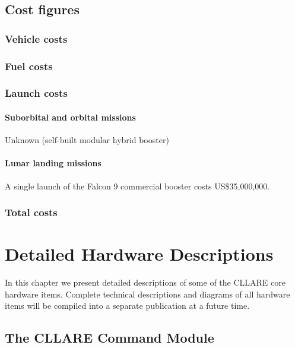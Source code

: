 \documentclass{report}
\begin{document}
\section{Cost figures}

\subsection{Vehicle costs}

\subsection{Fuel costs}

\subsection{Launch costs}

\subsubsection{Suborbital and orbital missions}

Unknown (self-built modular hybrid booster)

\subsubsection{Lunar landing missions}

A single launch of the Falcon 9 commercial booster costs US\$35,000,000.

\subsection{Total costs}


\chapter{Detailed Hardware Descriptions} \label{chap:detailed}

In this chapter we present detailed descriptions of some of the CLLARE core hardware items.  Complete technical descriptions and diagrams of all hardware items will be compiled into a separate publication at a future time.

\section{The CLLARE Command Module}
\end{document}
